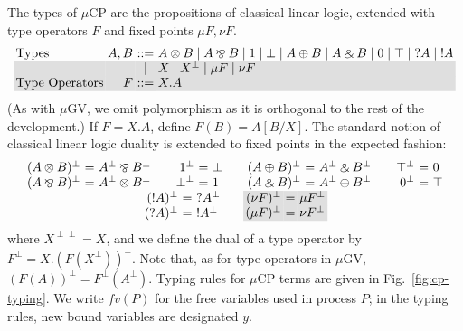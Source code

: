 \documentclass[orivec,envcountsame]{llncs}
\makeatletter
\newcommand{\with}{\mathbin\binampersand}
\newcommand{\parr}{\mathbin\bindnasrepma}
\newcommand{\cpdual}[1]{#1^\perp}
\newcommand{\cpbang}[1]{{! #1}}
\newcommand{\cpquery}[1]{{? #1}}
\newcommand{\mucp}{$\mu\mathrm{CP}$\xspace}
\newcommand{\mugv}{$\mu\mathrm{GV}$\xspace}
\newcommand{\ba}{\begin{array}}
\newcommand{\ea}{\end{array}}
\newenvironment{eqs}{\ba{@{}r@{~}c@{~}l@{}}}{\ea}
\newcommand\shaderow{\noalign{\vskip-0.4pt}\rowcolor{shade}[0.6mm]}
\makeatother
\begin{document}
The types of \mucp are the propositions of classical linear logic, extended with type operators $F$
and fixed points $\mu F,\nu F$.
%
\small\[\begin{array}{@{}l@{~}r@{~}c@{~}l@{}}
  \text{Types} & A,B & ::= & A \otimes B \mid A \parr B \mid 1 \mid \bot \mid A \oplus B \mid A \with B \mid 0 \mid \top
       \mid   \cpquery{A} \mid \cpbang{A} \\ \shaderow
   & & \mid & {X} \mid {\cpdual{X}}
       \mid   {\mu F} \mid {\nu F} \\ \shaderow
   \text{Type Operators} & F & ::= & X.A \\
\end{array}\]\normalsize
%
(As with \mugv, we omit polymorphism as it is orthogonal to the rest of the development.)  If $F =
X.A$, define $F(B) = A[B/X]$. The standard notion of classical linear logic duality is extended to
fixed points in the expected fashion:
\[
\ba{c}
\ba{@{}c@{\qquad}c@{\qquad}c@{\qquad}c@{}}
\begin{eqs}
  \cpdual{(A \otimes B)} &=& \cpdual{A} \parr \cpdual{B} \\
  \cpdual{(A \parr B)} &=& \cpdual{A} \otimes \cpdual{B} \\
\end{eqs}
&
\begin{eqs}
  \cpdual{1} &=& \bot \\
  \cpdual{\bot} &=& 1 \\
\end{eqs}
&
\begin{eqs}
  \cpdual{(A \oplus B)} &=& \cpdual{A} \with \cpdual{B} \\
  \cpdual{(A \with B)} &=& \cpdual{A} \oplus \cpdual{B} \\
\end{eqs}
&
\begin{eqs}
  \cpdual{\top} &=& 0 \\
  \cpdual{0} &=& \top \\
\end{eqs}
\ea
\\
\ba{@{}c@{\qquad}c@{}}
\begin{eqs}
  \cpdual{(\cpbang{A})} &=& \cpquery{\cpdual{A}} \\
  \cpdual{(\cpquery{A})} &=& \cpbang{\cpdual{A}} \\
\end{eqs}
&
\begin{eqs}
  \shaderow \cpdual{(\nu F)} &=& \mu \cpdual{F} \\
  \shaderow \cpdual{(\mu F)} &=& \nu \cpdual{F} \\
\end{eqs} \\
\ea
\ea
\]
where $X^{\perp\perp} = X$, and we define the dual of a type operator by $\cpdual{F} =
X.\cpdual{(F(\cpdual{X}))}.$ Note that, as for type operators in \mugv, $\cpdual{(F(A))} =
\cpdual{F}(\cpdual{A})$.  Typing rules for \mucp terms are given in Fig.~\ref{fig:cp-typing}.  We
write $fv(P)$ for the free variables used in process $P$; in the typing rules, new bound variables
are designated $y$.
\end{document}
